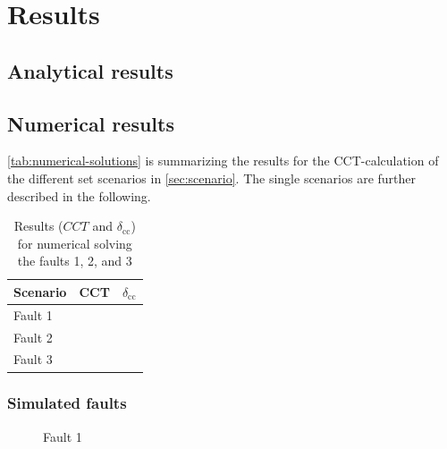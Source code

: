 \chapter{Results}
\label{chap:results}


\section{Analytical results}

\section{Numerical results}

\autoref{tab:numerical-solutions} is summarizing the results for the \acs{CCT}-calculation of the different set scenarios in \autoref{sec:scenario}. The single scenarios are further described in the following.

\begin{table}[!htb]
        \small
        \centering
        \caption[Numerical results for \acs{CCT}-calculations]{Results ($CCT$ and $\delta_\mathrm{cc}$) for numerical solving the faults 1, 2, and 3}
        \label{tab:numerical-solutions}
        \vspace{12pt}
        \begin{tabular}{|l|r|r|}
                \hline
                \rowcolor{lightgray} Scenario & \acs{CCT} & $\delta_\mathrm{cc}$ \\ \hline \hline
                Fault 1 & & \\ \hline
                Fault 2 & & \\ \hline
                Fault 3 & & \\ \hline         
        \end{tabular}
\end{table}

\subsection{Simulated faults}

\begin{figure}[H]
        \centering
                
        \caption[Fault 1]{Fault 1}
        \label{fig:fault1}
\end{figure}


